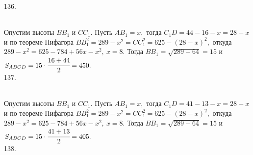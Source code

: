 \documentclass[12pt]{article}
\begin{document}
136. \begin{figure}[ht!]
\end{figure}\\
Опустим высоты $BB_1$ и $CC_1.$ Пусть $AB_1=x,$ тогда $C_1D=44-16-x=28-x$ и по теореме Пифагора $BB_1^2=289-x^2=CC_1^2=625-(28-x)^2,$ откуда
$289-x^2=625-784+56x-x^2,\ x=8.$ Тогда $BB_1=\sqrt{289-64}=15$ и $S_{ABCD}=15\cdot\cfrac{16+44}{2}=450.$\\
137. \begin{figure}[ht!]
\end{figure}\\
Опустим высоты $BB_1$ и $CC_1.$ Пусть $AB_1=x,$ тогда $C_1D=41-13-x=28-x$ и по теореме Пифагора $BB_1^2=289-x^2=CC_1^2=625-(28-x)^2,$ откуда
$289-x^2=625-784+56x-x^2,\ x=8.$ Тогда $BB_1=\sqrt{289-64}=15$ и $S_{ABCD}=15\cdot\cfrac{41+13}{2}=405.$\\
138. \begin{figure}[ht!]
\end{figure}\\
\end{document}
